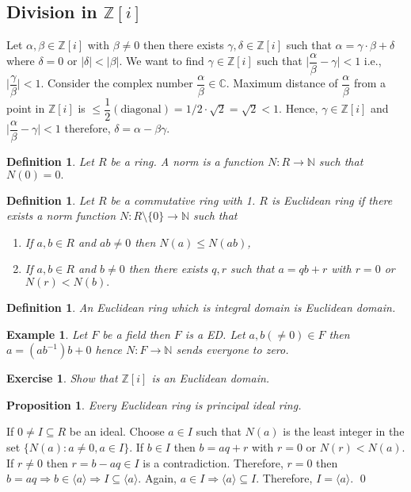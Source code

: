 \documentclass[11pt]{amsart}
\newtheorem{definition}[theorem]{Definition}%
\newtheorem{ex}[theorem]{Exercise}
\newtheorem{eg}[theorem]{Example}
\newtheorem{proposition}[theorem]{Proposition}%
\newcommand{\ZZ}{\mathbb Z}
\newcommand{\CC}{\mathbb C}
\newcommand{\NN}{\mathbb N}
\newcommand{\gen}[1]{\langle#1\rangle}
\begin{document}
\subsection{Division in ${\ZZ}[i]$}
Let $\alpha,\beta\in {\ZZ}[i] $ with $\beta\neq 0$ then there exists $\gamma,\delta\in {\ZZ}[i]$ such that $\alpha=\gamma \cdot \beta +\delta$ where $\delta=0$ or $|\delta|<|\beta|$. We want to find $\gamma\in {\ZZ}[i]$ such that $\bigg|\dfrac{\alpha}{\beta}-\gamma\bigg|<1$ i.e., $\bigg|\dfrac{\gamma}{\beta}\bigg|<1.$ Consider the complex number $\dfrac{\alpha}{\beta} \in {\CC}.$ Maximum distance of $\dfrac{\alpha}{\beta}$ from a point in ${\ZZ}[i]$ is $\leq \dfrac{1}{2}(\text{diagonal})=1/2\cdot \sqrt{2}=\sqrt{2}<1.$ Hence, $\gamma\in {\ZZ}[i]$ and $\bigg|\dfrac{\alpha}{\beta}-\gamma\bigg|<1$ therefore, $\delta=\alpha-\beta\gamma.$
\begin{definition}
Let $R$ be a ring. A norm is a function $N:R\to {\NN}$ such that $N(0)=0.$
\end{definition}
\begin{definition}
Let $R$ be a commutative ring with 1. $R$ is Euclidean ring if there exists a norm function $N:R\setminus \{0\}\to {\NN}$ such that \begin{enumerate}
\item If $a,b\in R$ and $ab\neq 0$ then $N(a)\leq N(ab)$,
\item If $a,b\in R$ and $b\neq 0$ then there exists $q,r$ such that $a=qb+r$ with $r=0$ or $N(r)<N(b).$
\end{enumerate}
\end{definition}
\begin{definition}
An Euclidean ring which is integral domain is Euclidean domain.
\end{definition}
\begin{eg}
Let $F$ be a field then $F$ is a ED. Let $a,b(\neq 0)\in F$ then $a=(ab^{-1})b+0$ hence $N:F\to {\NN}$ sends everyone to zero.
\end{eg}
\begin{ex}
Show that ${\ZZ}[i]$ is an Euclidean domain.
\end{ex}

\begin{proposition}
Every Euclidean ring is principal ideal ring.
\end{proposition}
\proof If $0\neq I\subseteq R$ be an ideal. Choose $a\in I$ such that $N(a)$ is the least integer in the set $\{N(a):a\neq 0,a\in I\}$. If $b\in I$ then $b=aq+r$ with $r=0$ or $N(r)<N(a)$. If $r\neq 0$ then $r=b-aq\in I$ is a contradiction. Therefore, $r=0$ then $b=aq \Rightarrow b\in \gen{a} \Rightarrow I\subseteq \gen{a}.$ Again, $a\in I \Rightarrow \gen{a}\subseteq I$. Therefore, $I=\gen{a}.$ \qed
\end{document}
